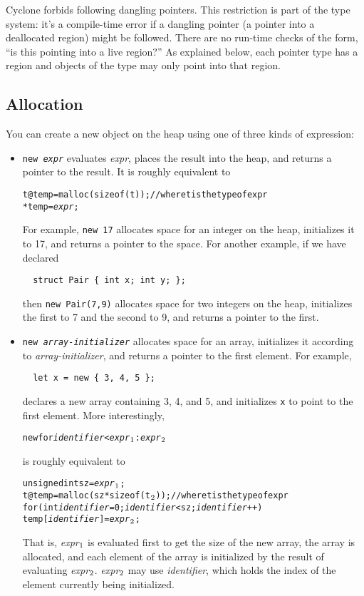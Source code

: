 Cyclone forbids following dangling pointers.  This restriction is part
of the type system: it's a compile-time error if a dangling pointer (a
pointer into a deallocated region) might be followed.  There are no
run-time checks of the form, ``is this pointing into a live region?''
As explained below, each pointer type has a region and objects of the
type may only point into that region.

\subsection{Allocation}
You can create a new object on the heap using one of three kinds of
expression: 
\begin{itemize}
\item \texttt{new {\it expr}} evaluates \textit{expr}, places the
  result into the heap, and returns a pointer to the result.  It is
  roughly equivalent to
\begin{alltt}
  t @ temp = malloc(sizeof(t)); // where t is the type of expr
  *temp = {\it expr};
\end{alltt}
  For example, \texttt{new 17} allocates space for an integer on the
  heap, initializes it to 17, and returns a pointer to the space.  For
  another example, if we have declared
\begin{verbatim}
  struct Pair { int x; int y; };
\end{verbatim}
  then \texttt{new Pair(7,9)} allocates space for two integers on the
  heap, initializes the first to 7 and the second to 9, and returns a
  pointer to the first.

\item \texttt{new {\it array-initializer}} allocates space for an
  array, initializes it according to \textit{array-initializer}, and
  returns a pointer to the first element.  For example,
\begin{verbatim}
  let x = new { 3, 4, 5 };
\end{verbatim}
  declares a new array containing 3, 4, and 5, and initializes
  \texttt{x} to point to the first element.  More interestingly,
\begin{alltt}
  new \lb for {\it identifier} < {\it expr}\(\sb{1}\) : {\it expr}\(\sb{2}\) \rb
\end{alltt}
  is roughly equivalent to
\begin{alltt}
  unsigned int sz = {\it expr}\(\sb{1}\);
  t @ temp = malloc(sz * sizeof(t\(\sb{2}\))); // where t is the  type of expr
  for (int {\it identifier} = 0; {\it identifier} < sz; {\it identifier}++)
    temp[{\it identifier}] = {\it expr}\(\sb{2}\);
\end{alltt}
  That is, 
  {\it expr}\(\sb{1}\)
  is evaluated first to get the size of the new array,
  the array is allocated, and each element of the array is
  initialized by the result of evaluating
  {\it expr}\(\sb{2}\).
  {\it expr}\(\sb{2}\) may use {\it identifier}, which 
  holds the index of the element currently being initialized.
  

\end{itemize}
